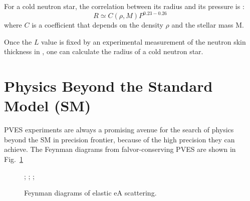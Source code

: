 For a cold neutron star, the correlation between its radius and its pressure is \cite{Lattimer.2001}:
\begin{equation}
    R \simeq C(\rho, M) P^{0.23-0.26} 
\end{equation}
where $C$ is a coefficient that depends on the density $\rho$ and the stellar mass M.

Once the $L$ value is fixed by an experimental measurement of the neutron skin 
thickness in \Pb, one can calculate the radius of a cold neutron star. 



\section{Physics Beyond the Standard Model (SM)} 
PVES experiments are always a promising avenue for the search of physics beyond the SM in precision frontier,
because of the high precision they can achieve.
The Feynman diagrams from falvor-conserving PVES are shown in Fig.~\ref{fig:BSM}
\begin{figure}[!h]
    \centering
{};
;
;
    \caption{Feynman diagrams of elastic eA scattering.}
    \label{fig:BSM}
\end{figure}

